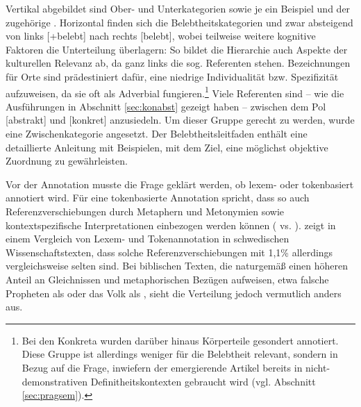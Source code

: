 Vertikal abgebildet sind Ober- und Unterkategorien sowie je ein Beispiel und der zugehörige . Horizontal finden sich die Belebtheitskategorien und zwar absteigend von links [+belebt] nach rechts [\textminus{}belebt],  wobei teilweise weitere kognitive Faktoren die Unterteilung überlagern: So bildet die Hierarchie auch Aspekte der kulturellen Relevanz ab, da ganz links die sog.  Referenten stehen. Bezeichnungen für Orte sind prädestiniert dafür, eine niedrige Individualität bzw. Spezifizität aufzuweisen, da sie oft als Adverbial fungieren.\footnote{Bei den Konkreta wurden darüber hinaus Körperteile gesondert annotiert. Diese Gruppe ist allerdings weniger für die Belebtheit relevant, sondern in Bezug auf die Frage, inwiefern der emergierende Artikel bereits in nicht-demonstrativen Definitheitskontexten gebraucht wird (vgl. Abschnitt \ref{sec:pragsem}).} Viele Referenten sind -- wie die Ausführungen in Abschnitt \ref{sec:konabst} gezeigt haben -- zwischen dem Pol [abstrakt] und [konkret] anzusiedeln. Um dieser Gruppe gerecht zu werden, wurde eine Zwischenkategorie angesetzt. Der Belebtheitsleitfaden enthält eine detaillierte Anleitung mit Beispielen, mit dem Ziel, eine möglichst objektive Zuordnung zu gewährleisten.

Vor der Annotation musste die Frage geklärt werden, ob lexem- oder tokenbasiert annotiert wird. Für eine tokenbasierte Annotation spricht, dass so auch Referenzverschiebungen durch Metaphern und Metonymien sowie kontextspezifische Interpretationen einbezogen werden können ( vs. ). \textcite{Ovrelid2009} zeigt in einem Vergleich von Lexem- und Tokenannotation in schwedischen Wissenschaftstexten, dass solche Referenzverschiebungen mit 1,1\%  allerdings vergleichsweise selten sind.  Bei biblischen Texten, die naturgemäß einen höheren Anteil an Gleichnissen und metaphorischen Bezügen aufweisen, etwa falsche Propheten als  oder das Volk als , sieht die Verteilung jedoch vermutlich anders aus. 

